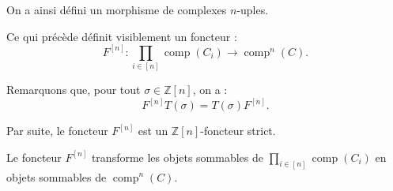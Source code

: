 On a ainsi défini un morphisme de complexes $n$-uples.

Ce qui précède définit visiblement un foncteur :
\begin{equation}
  F^{[n]}\colon
  \prod_{i\in[n]}\operatorname{comp}(C_i)
  \longrightarrow \operatorname{comp}^{n}(C).
  \tag{2.4.2.4}
\end{equation}

Remarquons que, pour tout $\sigma\in\mathbb Z[n]$, on a :
\begin{equation}
  F^{[n]}T(\sigma)=T(\sigma)F^{[n]}.
  \tag{2.4.2.5}
\end{equation}

Par suite, le foncteur $F^{[n]}$ est un $\mathbb Z[n]$-foncteur strict.

Le foncteur $F^{[n]}$ transforme les objets sommables de
$\prod_{i\in[n]}\operatorname{comp}(C_i)$ en objets sommables de
$\operatorname{comp}^{n}(C)$.
